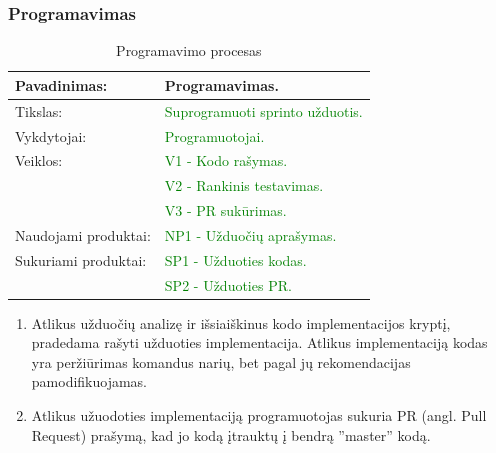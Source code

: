 \documentclass{VUMIFPSkursinis}
\begin{document}
	\subsubsection{Programavimas}
	\begin{center}
		\begin{table}[ht]
			\caption{Programavimo procesas}
			\begin{tabular}{ | l | l | }
				\hline
				Pavadinimas:		& Programavimas.			\\ \hline
				Tikslas:		& \textcolor{green}{Suprogramuoti sprinto užduotis.}	\\ \hline
				Vykdytojai:		&\textcolor{green}{ Programuotojai.	}		\\ \hline
				Veiklos:		&\textcolor{green}{ V1 - Kodo rašymas.}			\\
							&\textcolor{green}{ V2 - Rankinis testavimas.} 		\\
							& \textcolor{green}{V3 - PR sukūrimas.}			\\ \hline
				Naudojami produktai:	&\textcolor{green}{ NP1 - Užduočių aprašymas.}	\\ \hline
				Sukuriami produktai:	&\textcolor{green}{ SP1 - Užduoties kodas.}		\\
							& \textcolor{green}{SP2 - Užduoties PR.}			\\ \hline
			\end{tabular}
		\end{table}
	\end{center}
		\begin{enumerate}
			\item{
				Atlikus užduočių analizę ir išsiaiškinus kodo implementacijos kryptį, pradedama rašyti užduoties implementacija.
				Atlikus implementaciją kodas yra peržiūrimas komandus narių, bet pagal jų rekomendacijas pamodifikuojamas.
			}
			\item{Atlikus užuodoties implementaciją programuotojas sukuria PR (angl. Pull Request) prašymą, kad jo kodą įtrauktų į bendrą ''master'' kodą.}
		\end{enumerate}
\end{document}
